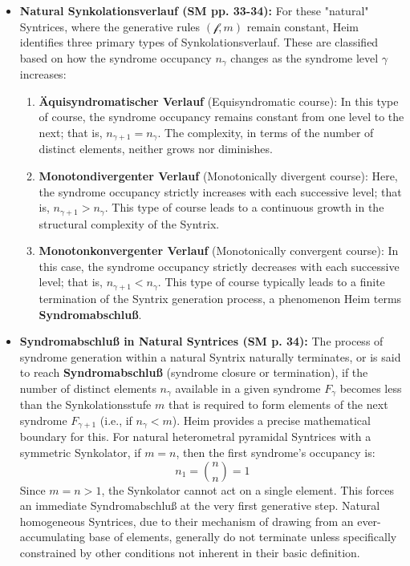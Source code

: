 \documentclass[12pt]{article}
\newcommand{\synkolator}{\mathcal{f}}
\newcommand{\synkolationsstufe}{m}
\newcommand{\syndrom}{F}
\begin{document}
\begin{itemize}
    \item \textbf{Natural Synkolationsverlauf (SM pp. 33-34):}
    For these "natural" Syntrices, where the generative rules \( (\synkolator, \synkolationsstufe) \) remain constant, Heim identifies three primary types of Synkolationsverlauf. These are classified based on how the syndrome occupancy \( n_\gamma \) changes as the syndrome level \( \gamma \) increases:
    \begin{enumerate}
        \item \textbf{Äquisyndromatischer Verlauf} (Equisyndromatic course): In this type of course, the syndrome occupancy remains constant from one level to the next; that is, \( n_{\gamma+1} = n_\gamma \). The complexity, in terms of the number of distinct elements, neither grows nor diminishes.
        \item \textbf{Monotondivergenter Verlauf} (Monotonically divergent course): Here, the syndrome occupancy strictly increases with each successive level; that is, \( n_{\gamma+1} > n_\gamma \). This type of course leads to a continuous growth in the structural complexity of the Syntrix.
        \item \textbf{Monotonkonvergenter Verlauf} (Monotonically convergent course): In this case, the syndrome occupancy strictly decreases with each successive level; that is, \( n_{\gamma+1} < n_\gamma \). This type of course typically leads to a finite termination of the Syntrix generation process, a phenomenon Heim terms \textbf{Syndromabschluß}.
    \end{enumerate}

    \item \textbf{Syndromabschluß in Natural Syntrices (SM p. 34):}
    The process of syndrome generation within a natural Syntrix naturally terminates, or is said to reach \textbf{Syndromabschluß} (syndrome closure or termination), if the number of distinct elements \( n_\gamma \) available in a given syndrome \( \syndrom_\gamma \) becomes less than the Synkolationsstufe \( \synkolationsstufe \) that is required to form elements of the next syndrome \( \syndrom_{\gamma+1} \) (i.e., if \( n_\gamma < \synkolationsstufe \)). Heim provides a precise mathematical boundary for this. For natural heterometral pyramidal Syntrices with a symmetric Synkolator, if $m=n$, then the first syndrome's occupancy is:
    \begin{equation*}
    n_1 = \binom{n}{n} = 1
    \end{equation*}
    Since $m=n > 1$, the Synkolator cannot act on a single element. This forces an immediate Syndromabschluß at the very first generative step. Natural homogeneous Syntrices, due to their mechanism of drawing from an ever-accumulating base of elements, generally do not terminate unless specifically constrained by other conditions not inherent in their basic definition.


\end{itemize}
\end{document}
